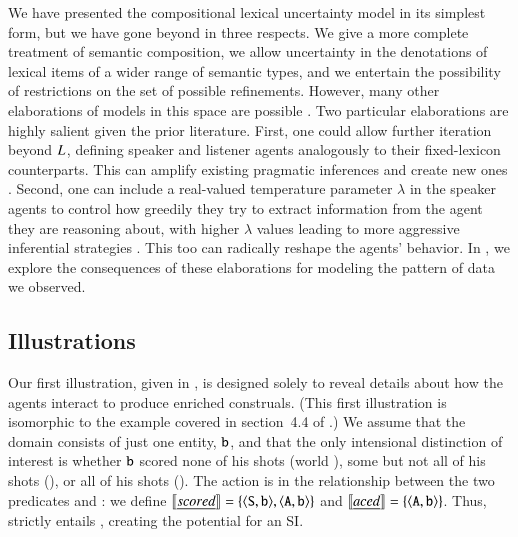 \documentclass[leqno,12pt]{article}
\begin{document}
We have presented the compositional lexical uncertainty model in its
simplest form, but we have gone beyond
\citeauthor{Bergen:Levy:Goodman:2014} in three respects. We give a
more complete treatment of semantic composition, we allow uncertainty
in the denotations of lexical items of a wider range of semantic
types, and we entertain the possibility of restrictions on the set of
possible refinements.  However, many other elaborations of models in
this space are possible \citep{Goodman:Lassiter:2013,
  Smith:Goodman:Frank:2013, Kao-etal:2014,Potts:Levy:2015}.  Two
particular elaborations are highly salient given the prior literature.
First, one could allow further iteration beyond
$L_{}$, defining speaker and listener agents
analogously to their fixed-lexicon counterparts. This can amplify
existing pragmatic inferences and create new ones
\citep{Bergen:Levy:Goodman:2014,Vogel-etal:2014,Potts:Levy:2015}.
Second, one can include a real-valued temperature parameter $\lambda$
in the speaker agents to control how greedily they try to extract
information from the agent they are reasoning about, with higher
$\lambda$ values leading to more aggressive inferential strategies
\citep{Sutton:Barto:1998}. This too can radically reshape the agents'
behavior. In , we explore the
consequences of these elaborations for modeling the pattern of data we
observed.


\subsection{Illustrations}\label{sec:illustrations}

Our first illustration, given in , is
designed solely to reveal details about how the agents interact to
produce enriched construals. (This first illustration is isomorphic to
the example covered in section~4.4 of
\citealp{Bergen:Levy:Goodman:2014}.) We assume that the domain
consists of just one entity, $\texttt{b}$, and that the only intensional
distinction of interest is whether $\texttt{b}$ scored none of his shots
(world ), some but not all of his shots (), or all
of his shots (). The action is in the relationship between
the two predicates  and : we define
$\llbracket\emph{scored\/}\rrbracket = \left\{ \langle \texttt{S}, \texttt{b} \rangle,
  \langle \texttt{A}, \texttt{b} \rangle \right\}$
and $\llbracket\emph{aced\/}\rrbracket = \left\{ \langle \texttt{A}, \texttt{b} \rangle \right\}$. Thus,
 strictly entails , creating the potential for
an SI.
\end{document}
